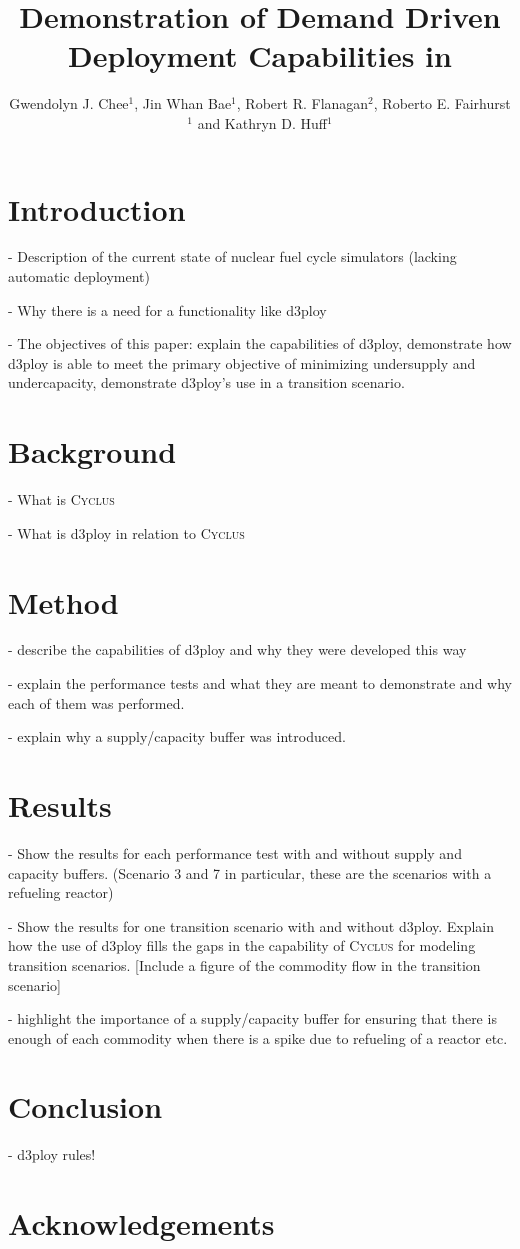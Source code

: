 \documentclass{anstrans}
\title{Demonstration of Demand Driven Deployment Capabilities in \Cyclus}
\author{Gwendolyn J. Chee$^1$, Jin Whan Bae$^1$, Robert R. Flanagan$^2$, Roberto E. Fairhurst$^1$ and Kathryn D. Huff$^1$}
\institute{
$^1$Dept. of Nuclear, Plasma and Radiological Engineering, University of Illinois at Urbana-Champaign \\
$^2$Nuclear Engineering Program, University of South Carolina \\

gchee2@illinois.edu
}
\newcommand{\Cyclus}{\textsc{Cyclus}\xspace}%
\begin{document}
\section{Introduction}
- Description of the current state of nuclear fuel cycle simulators
(lacking automatic deployment) 

- Why there is a need for a functionality like d3ploy 

- The objectives of this paper: explain the capabilities of d3ploy, 
demonstrate how d3ploy is able to meet the primary objective of 
minimizing undersupply and undercapacity, demonstrate d3ploy's use 
in a transition scenario.  

\section{Background}
- What is \Cyclus 

- What is d3ploy in relation to \Cyclus 

\section{Method}
- describe the capabilities of d3ploy and why they were developed
this way 

- explain the performance tests and what they are meant to demonstrate
and why each of them was performed. 

- explain why a supply/capacity buffer was introduced. 

\section{Results}
- Show the results for each performance test with and without 
supply and capacity buffers. (Scenario 3 and 7 in particular, 
these are the scenarios with a refueling reactor)

- Show the results for one transition scenario with and without
d3ploy. Explain how the use of d3ploy fills the gaps in the 
capability of \Cyclus for modeling transition scenarios. 
[Include a figure of the commodity flow in the transition scenario]  

- highlight the importance of a supply/capacity buffer for 
ensuring that there is enough of each commodity when there is 
a spike due to refueling of a reactor etc. 

\section{Conclusion}
- d3ploy rules! 

\section{Acknowledgements}



\end{document}
